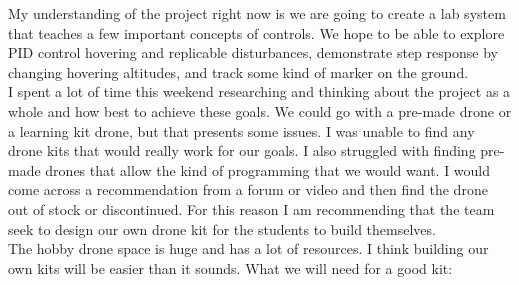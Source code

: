\documentclass[12pt, titlepage]{article}
\begin{document}
	My understanding of the project right now is we are going to create a lab system that teaches a few important concepts of controls. We hope to be able to explore PID control hovering and replicable disturbances, demonstrate step response by changing hovering altitudes, and track some kind of marker on the ground. \\

	I spent a lot of time this weekend researching and thinking about the project as a whole and how best to achieve these goals. We could go with a pre-made drone or a learning kit drone, but that presents some issues. I was unable to find any drone kits that would really work for our goals. I also struggled with finding pre-made drones that allow the kind of programming that we would want. I would come across a recommendation from a forum or video and then find the drone out of stock or discontinued. For this reason I am recommending that the team seek to design our own drone kit for the students to build themselves. \\
	
	The hobby drone space is huge and has a lot of resources. I think building  our own kits will be easier than it sounds. What we will need for a good kit: \\
	
\end{document}
